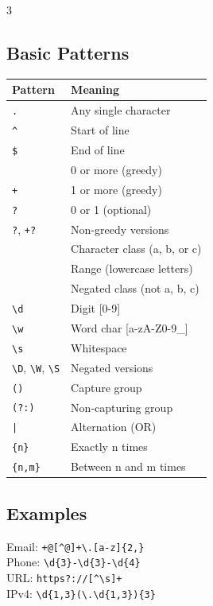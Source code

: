 \documentclass[7pt,landscape]{extarticle}
\newcommand{\code}[1]{\texttt{\fontsize{6pt}{7pt}\selectfont#1}}
\begin{document}
\begin{multicols*}{3}
\subsection*{Basic Patterns}
{\fontsize{5.5pt}{6.5pt}\selectfont
\begin{tabular}{@{}l@{\,}l@{}}
\toprule
\textbf{Pattern} & \textbf{Meaning} \\
\midrule
\code{.} & Any single character \\
\code{\^{}} & Start of line \\
\code{\$} & End of line \\
\code{*} & 0 or more (greedy) \\
\code{+} & 1 or more (greedy) \\
\code{?} & 0 or 1 (optional) \\
\code{*?}, \code{+?} & Non-greedy versions \\
\code{[abc]} & Character class (a, b, or c) \\
\code{[a-z]} & Range (lowercase letters) \\
\code{[\^{}abc]} & Negated class (not a, b, c) \\
\code{\textbackslash d} & Digit [0-9] \\
\code{\textbackslash w} & Word char [a-zA-Z0-9\_] \\
\code{\textbackslash s} & Whitespace \\
\code{\textbackslash D}, \code{\textbackslash W}, \code{\textbackslash S} & Negated versions \\
\code{()} & Capture group \\
\code{(?:)} & Non-capturing group \\
\code{|} & Alternation (OR) \\
\code{\{n\}} & Exactly n times \\
\code{\{n,m\}} & Between n and m times \\
\bottomrule
\end{tabular}}

\subsection*{Examples}
Email: \code{[\^{}@]+@[\^{}@]+\textbackslash.[a-z]\{2,\}} \\
Phone: \code{\textbackslash d\{3\}-\textbackslash d\{3\}-\textbackslash d\{4\}} \\
URL: \code{https?://[\^{}\textbackslash s]+} \\
IPv4: \code{\textbackslash d\{1,3\}(\textbackslash.\textbackslash d\{1,3\})\{3\}}


\end{multicols*}
\end{document}
